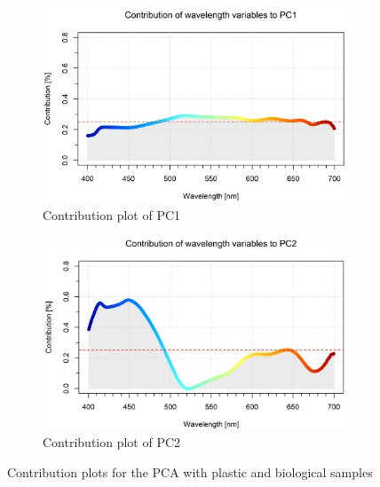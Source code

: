 \begin{figure}[H]
\centering
\begin{subfigure}{.5\textwidth}
  \centering
  \includegraphics[width=\textwidth]{Images/results/PCA_plastics_and_biology_cont_pc1.png}
  \caption{Contribution plot of PC1}
  \label{fig:PCA_plastics_and_biology_cont_pc1}
\end{subfigure}%
\begin{subfigure}{.5\textwidth}
  \centering
  \includegraphics[width=\textwidth]{Images/results/PCA_plastics_and_biology_cont_pc2.png}
  \caption{Contribution plot of PC2}
  \label{fig:PCA_plastics_and_biology_cont_pc2}
\end{subfigure}
\caption{Contribution plots for the PCA with plastic and biological samples}
\label{fig:PCA_and_bio_cont_plots}
\end{figure}

\vspace{1.3cm}
